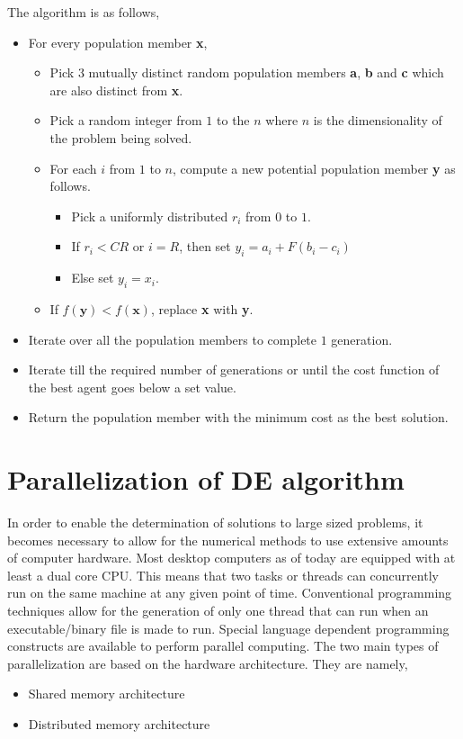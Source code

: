 The algorithm is as follows,
\begin{itemize}
	\item For every population member \textbf{x},
	\begin{itemize}
		\item Pick 3 mutually distinct random population members \textbf{a}, \textbf{b} and \textbf{c} which are also distinct from \textbf{x}.
		\item Pick a random integer from $1$ to the $n$ where $n$ is the dimensionality of the problem being solved.
		\item For each $i$ from $1$ to $n$, compute a new potential population member \textbf{y} as follows.
		\begin{itemize}
			\item Pick a uniformly distributed $r_i$ from $0$ to $1$.
			\item If $r_i<CR$ or $i=R$, then set $y_i=a_i+F(b_i-c_i)$ 
			\item Else set $y_i=x_i$.
		\end{itemize}
		\item If $f(\textbf{y})<f(\textbf{x})$, replace \textbf{x} with \textbf{y}.
	\end{itemize}
	\item Iterate over all the population members to complete $1$ generation.
	\item Iterate till the required number of generations or until the cost function of the best agent goes below a set value.
	\item Return the population member with the minimum cost as the best solution.
\end{itemize}


\section{Parallelization of DE algorithm}
In order to enable the determination of solutions to large sized problems, it becomes necessary to allow for the numerical methods to use extensive amounts of computer hardware. Most desktop computers as of today are equipped with at least a dual core CPU. This means that two tasks or threads can concurrently run on the same machine at any given point of time. Conventional programming techniques allow for the generation of only one thread that can run when an executable/binary file is made to run. Special language dependent programming constructs are available to perform parallel computing. The two main types of parallelization are based on the hardware architecture. They are namely,
\begin{itemize}
	\item Shared memory architecture
	\item Distributed memory architecture
\end{itemize}


